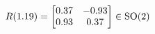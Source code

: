 \documentclass[preview]{standalone}
\begin{document}
\begin{align*}
\special{dvisvgm:raw <g id='unique000'>}R(1.19) = \begin{bmatrix} 0.37 & -0.93 \\ 0.93 & 0.37 \end{bmatrix} \in \text{SO}(2)\special{dvisvgm:raw </g>}
\end{align*}
\end{document}
